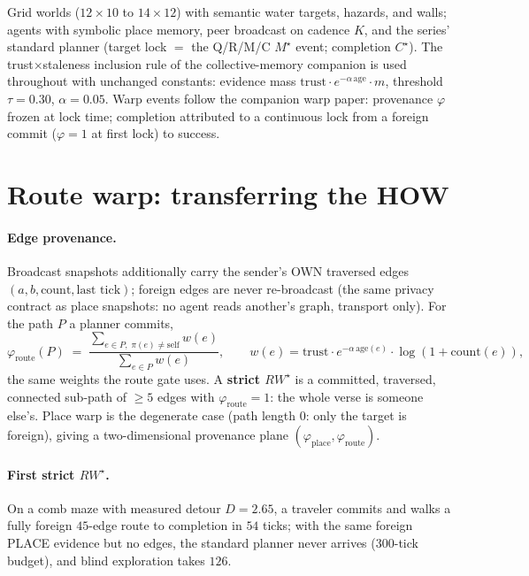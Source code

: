 \documentclass{article}
\newcommand{\rwstar}{RW^{\star}}
\newcommand{\mstar}{M^{\star}}
\newcommand{\cstar}{C^{\star}}
\newcommand{\phiroute}{\varphi_{\mathrm{route}}}
\begin{document}
Grid worlds ($12{\times}10$ to $14{\times}12$) with semantic water
targets, hazards, and walls; agents with symbolic place memory,
peer broadcast on cadence $K$, and the series' standard planner
(target lock $=$ the Q/R/M/C $\mstar$ event; completion $\cstar$).
The trust$\times$staleness inclusion rule of the collective-memory
companion is used throughout with unchanged constants: evidence
mass $\text{trust}\cdot e^{-\alpha\,\text{age}}\cdot m$, threshold
$\tau{=}0.30$, $\alpha{=}0.05$. Warp events follow the companion warp
paper: provenance $\varphi$ frozen at lock time; completion attributed
to a continuous lock from a foreign commit ($\varphi{=}1$ at first
lock) to success. %

\section{Route warp: transferring the HOW}
\label{sec:route}

\paragraph{Edge provenance.} Broadcast snapshots additionally carry the
sender's OWN traversed edges $(a,b,\text{count},\text{last tick})$;
foreign edges are never re-broadcast (the same privacy contract as
place snapshots: no agent reads another's graph, transport only). For
the path $P$ a planner commits,
\[
\phiroute(P) \;=\;
\frac{\sum_{e\in P,\;\pi(e)\neq\mathrm{self}} w(e)}
     {\sum_{e\in P} w(e)},
\qquad w(e) = \text{trust}\cdot e^{-\alpha\,\text{age}(e)}\cdot
\log(1{+}\text{count}(e)),
\]
the same weights the route gate uses. A \textbf{strict $\rwstar$} is a
committed, traversed, connected sub-path of $\ge 5$ edges with
$\phiroute = 1$: the whole verse is someone else's. Place warp is the
degenerate case (path length $0$: only the target is foreign), giving
a two-dimensional provenance plane $(\varphi_{\mathrm{place}},
\phiroute)$.

\paragraph{First strict $\rwstar$.} On a comb maze with measured
detour $D{=}2.65$, a traveler commits and walks a fully foreign
$45$-edge route to completion in $54$ ticks; with the same foreign
PLACE evidence but no edges, the standard planner never arrives
(300-tick budget), and blind exploration takes $126$.
\end{document}
